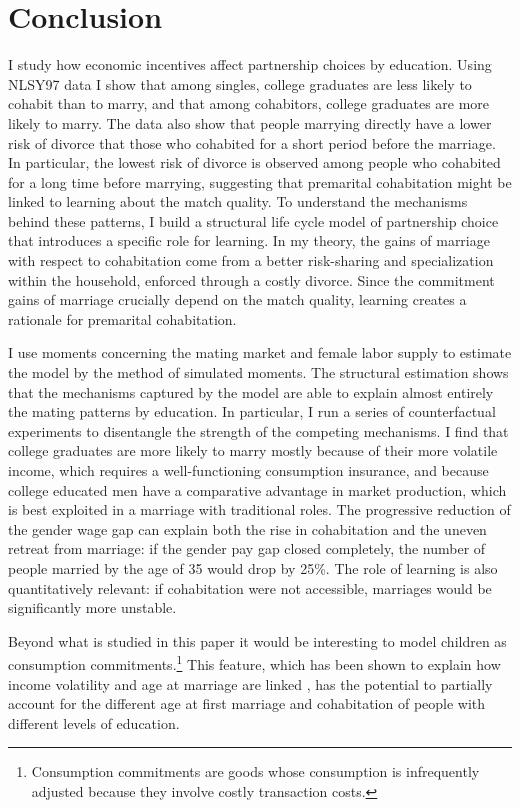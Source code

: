 \documentclass[12pt]{article}
\begin{document}
\section{Conclusion}
I study how economic incentives affect partnership choices by education. Using NLSY97 data I show that among singles, college graduates are less likely to cohabit than to marry, and that among cohabitors, college graduates are more likely to marry. The data also show that people marrying directly have a lower risk of divorce that those who cohabited for a short period before the marriage. In particular, the lowest risk of divorce is observed among people who cohabited for a long time before marrying, suggesting that premarital cohabitation might be linked to learning about the match quality. To understand the mechanisms behind these patterns, I build a structural life cycle model of partnership choice that introduces a specific role for learning. In my theory, the gains of marriage with respect to cohabitation come from a better risk-sharing and specialization within the household, enforced through a costly divorce. Since the commitment gains of marriage crucially depend on the match quality, learning creates a rationale for premarital cohabitation. 

I use moments concerning the mating market and female labor supply to estimate the model by the method of simulated moments. The structural estimation shows that the mechanisms captured by the model are able to explain almost entirely the mating patterns by education. In particular, I run a series of counterfactual experiments to disentangle the strength of the competing mechanisms. I find that college graduates are more likely to marry mostly because of their more volatile income, which requires a well-functioning consumption insurance, and because college educated men have a comparative advantage in market production, which is best exploited in a marriage with traditional roles. The progressive reduction of the gender wage gap can explain both the rise in cohabitation and the uneven retreat from marriage: if the gender pay gap closed completely, the number of people married by the age of 35 would drop by 25\%. The role of learning is also quantitatively relevant: if cohabitation were not accessible, marriages would be significantly more unstable.

Beyond what is studied in this paper it would be interesting to model children as consumption commitments.\footnote{Consumption commitments are goods whose consumption is infrequently adjusted because they involve costly transaction costs.} This feature, which has been shown to explain how income volatility and age at marriage are linked \citep{santos2016}, has the potential to partially account for the different age at first marriage and cohabitation of people with different levels of education.
\end{document}
